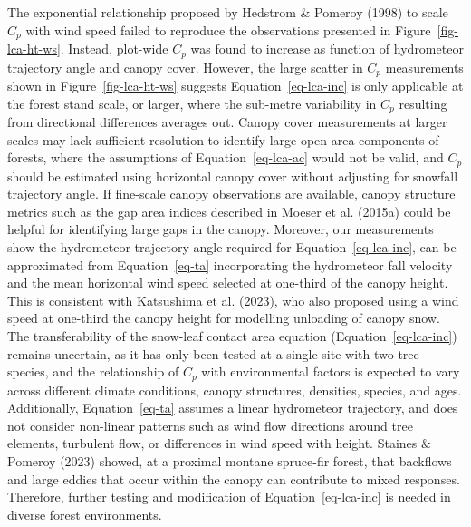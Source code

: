 \documentclass[
  letterpaper,
]{tex/uofsthesis-cs}
\begin{document}
The exponential relationship proposed by Hedstrom \& Pomeroy (1998) to
scale \(C_p\) with wind speed failed to reproduce the observations
presented in Figure~\ref{fig-lca-ht-ws}. Instead, plot-wide \(C_p\) was
found to increase as function of hydrometeor trajectory angle and canopy
cover. However, the large scatter in \(C_p\) measurements shown in
Figure~\ref{fig-lca-ht-ws} suggests Equation~\ref{eq-lca-inc} is only
applicable at the forest stand scale, or larger, where the sub-metre
variability in \(C_p\) resulting from directional differences averages
out. Canopy cover measurements at larger scales may lack sufficient
resolution to identify large open area components of forests, where the
assumptions of Equation~\ref{eq-lca-ac} would not be valid, and \(C_p\)
should be estimated using horizontal canopy cover without adjusting for
snowfall trajectory angle. If fine-scale canopy observations are
available, canopy structure metrics such as the gap area indices
described in Moeser et al. (2015a) could be helpful for identifying
large gaps in the canopy. Moreover, our measurements show the
hydrometeor trajectory angle required for Equation~\ref{eq-lca-inc}, can
be approximated from Equation~\ref{eq-ta} incorporating the hydrometeor
fall velocity and the mean horizontal wind speed selected at one-third
of the canopy height. This is consistent with Katsushima et al. (2023),
who also proposed using a wind speed at one-third the canopy height for
modelling unloading of canopy snow. The transferability of the snow-leaf
contact area equation (Equation~\ref{eq-lca-inc}) remains uncertain, as
it has only been tested at a single site with two tree species, and the
relationship of \(C_p\) with environmental factors is expected to vary
across different climate conditions, canopy structures, densities,
species, and ages. Additionally, Equation~\ref{eq-ta} assumes a linear
hydrometeor trajectory, and does not consider non-linear patterns such
as wind flow directions around tree elements, turbulent flow, or
differences in wind speed with height. Staines \& Pomeroy (2023) showed,
at a proximal montane spruce-fir forest, that backflows and large eddies
that occur within the canopy can contribute to mixed responses.
Therefore, further testing and modification of Equation~\ref{eq-lca-inc}
is needed in diverse forest environments.
\end{document}
